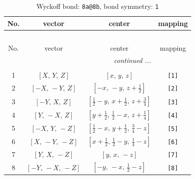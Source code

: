 \documentclass[fleqn,8pt]{jsarticle}
\begin{document}
\begin{longtable}{cccc}
\caption{Wyckoff bond: {\tt 8a@8b}, bond symmetry: {\tt 1}}
 \\
 \hline \hline
No. & vector & center & mapping \\ \hline \endfirsthead

\multicolumn{3}{l}{\tablename\ \thetable{}} \\
 \hline \hline
No. & vector & center & mapping \\ \hline \endhead

 \hline \hline
\multicolumn{3}{r}{\footnotesize\it continued ...} \\ \endfoot

 \hline \hline
\multicolumn{3}{r}{} \\ \endlastfoot

1 & $\left[ X,\, Y,\, Z \right]$ & $\left[ x,\, y,\, z \right]$ & {\tt [1]} \\ \hline
2 & $\left[ - X,\, - Y,\, Z \right]$ & $\left[ - x,\, - y,\, z + \frac{1}{2} \right]$ & {\tt [2]} \\ \hline
3 & $\left[ - Y,\, X,\, Z \right]$ & $\left[ \frac{1}{2} - y,\, x + \frac{1}{2},\, z + \frac{3}{4} \right]$ & {\tt [3]} \\ \hline
4 & $\left[ Y,\, - X,\, Z \right]$ & $\left[ y + \frac{1}{2},\, \frac{1}{2} - x,\, z + \frac{1}{4} \right]$ & {\tt [4]} \\ \hline
5 & $\left[ - X,\, Y,\, - Z \right]$ & $\left[ \frac{1}{2} - x,\, y + \frac{1}{2},\, \frac{3}{4} - z \right]$ & {\tt [5]} \\ \hline
6 & $\left[ X,\, - Y,\, - Z \right]$ & $\left[ x + \frac{1}{2},\, \frac{1}{2} - y,\, \frac{1}{4} - z \right]$ & {\tt [6]} \\ \hline
7 & $\left[ Y,\, X,\, - Z \right]$ & $\left[ y,\, x,\, - z \right]$ & {\tt [7]} \\ \hline
8 & $\left[ - Y,\, - X,\, - Z \right]$ & $\left[ - y,\, - x,\, \frac{1}{2} - z \right]$ & {\tt [8]} \\
\end{longtable}
\end{document}
